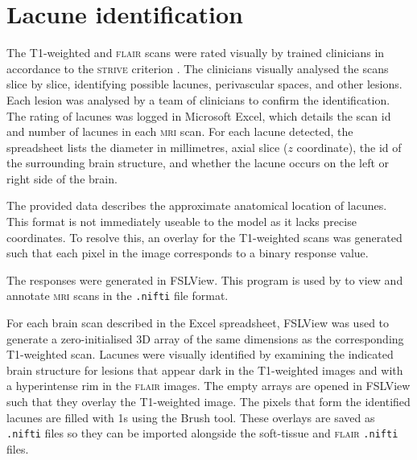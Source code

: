 
\section{Lacune identification}\label{data-lacune}

The T1-weighted and \textsc{flair} scans were rated visually by trained clinicians in accordance to the \textsc{strive} criterion \cite{WardlawJ.M.2013Nsfr}. The clinicians visually analysed the scans slice by slice, identifying possible lacunes, perivascular spaces, and other lesions. Each lesion was analysed by a team of clinicians to confirm the identification. The rating of lacunes was logged in Microsoft Excel, which details the scan id and number of lacunes in each \textsc{mri} scan. For each lacune detected, the spreadsheet lists the diameter in millimetres, axial slice ($z$ coordinate), the id of the surrounding brain structure, and whether the lacune occurs on the left or right side of the brain.


The provided data describes the approximate anatomical location of lacunes. This format is not immediately useable to the model as it lacks precise coordinates. To resolve this, an overlay for the T1-weighted scans was generated such that each pixel in the image corresponds to a binary response value.

The responses were generated in FSLView. This program is used by to view and annotate \textsc{mri} scans in the \texttt{.nifti} file format.

For each brain scan described in the Excel spreadsheet, FSLView was used to generate a zero-initialised 3D array of the same dimensions as the corresponding T1-weighted scan. Lacunes were visually identified by examining the indicated brain structure for lesions that appear dark in the T1-weighted images and with a hyperintense rim in the \textsc{flair} images. The empty arrays are opened in FSLView such that they overlay the T1-weighted image. The pixels that form the identified lacunes are filled with 1s using the Brush tool. These overlays are saved as \texttt{.nifti} files so they can be imported alongside the soft-tissue and \textsc{flair} \texttt{.nifti} files.


